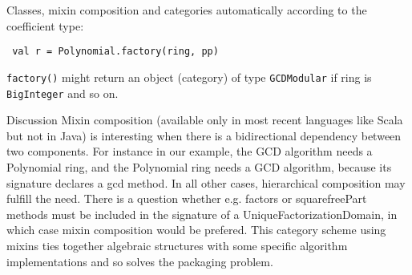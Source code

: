 \documentclass[final]{beamer}
\newcommand{\code}[1]{\texttt{#1}}
\begin{document}
\begin{frame}[fragile]
\begin{columns}[t]
\begin{column}{.3\linewidth}
\begin{block}{\large Classes, mixin composition and categories}
{automatically according to the coefficient type:}\par
\begin{lstlisting}
 val r = Polynomial.factory(ring, pp)
\end{lstlisting}
{\footnotesize \code{factory()} might return an object
(category) of type \code{GCDModular} if ring is \code{BigInteger} and so on.
}
  \end{block}
  \hfill
  \begin{block}{\large Discussion}
\scriptsize
Mixin composition (available only in most recent languages like Scala
but not in Java) is interesting when there is a bidirectional dependency
between two components. For instance in our example, the GCD algorithm
needs a Polynomial ring, and the Polynomial ring needs a GCD algorithm,
because its signature declares a gcd method. In all other cases,
hierarchical composition may fulfill the need. There is a question
whether e.g. factors or squarefreePart methods must be included in the
signature of a UniqueFactorizationDomain, in which case mixin
composition would be prefered.
This category scheme using mixins ties together algebraic structures with 
some specific algorithm implementations and so solves the packaging problem.
  \end{block}
\end{column}

\end{columns}

\end{frame}


%
%
%
%
%
\end{document}
